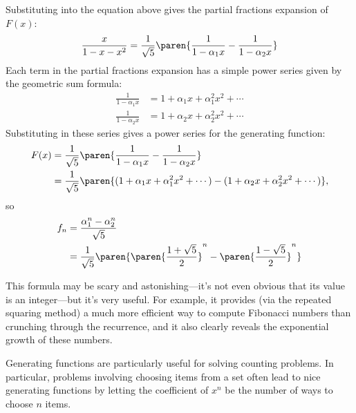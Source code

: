 Substituting into the equation above gives the partial fractions
expansion of $F(x)$:
%
\[
\frac{x}{1 - x - x^2} =
        \frac{1}{\sqrt{5}}
        \paren{\frac{1}{1 - \alpha_1 x} - \frac{1}{1 - \alpha_2 x}}
\]
%
Each term in the partial fractions expansion has a simple power series
given by the geometric sum formula:
%
\begin{align*}
\frac{1}{1 - \alpha_1 x} & = 1 + \alpha_1 x + \alpha_1^2 x^2 + \cdots \\
\frac{1}{1 - \alpha_2 x} & = 1 + \alpha_2 x + \alpha_2^2 x^2 + \cdots
\end{align*}
%
Substituting in these series gives a power series for the generating
function:
%
\begin{align*}
F(x) & =
  \frac{1}{\sqrt{5}}
  \paren{\frac{1}{1 - \alpha_1 x} -
        \frac{1}{1 - \alpha_2 x}}\\
    & = \frac{1}{\sqrt{5}}
        \paren{(1 + \alpha_1 x + \alpha_1^2 x^2 + \cdots) -
        (1 + \alpha_2 x + \alpha_2^2 x^2 + \cdots)},
\end{align*}
so
\begin{align*}
 f_n & = \frac{\alpha_1^n - \alpha_2^n}{\sqrt{5}} \\
                & = \frac{1}{\sqrt{5}}
        \paren{
         \paren{\frac{1 + \sqrt{5}}{2}}^n -
         \paren{\frac{1 - \sqrt{5}}{2}}^n}
\end{align*}

This formula may be scary and astonishing---it's not even obvious that
its value is an integer---but it's very useful.  For example, it provides
(via the repeated squaring method) a much more efficient way to compute
Fibonacci numbers than crunching through the recurrence, and it also
clearly reveals the exponential growth of these numbers.

\begin{problems}
\classproblems
{}

\homeworkproblems
{}

\end{problems}


Generating functions are particularly useful for solving counting
problems.  In particular, problems involving choosing items from a set
often lead to nice generating functions by letting the coefficient of
$x^n$ be the number of ways to choose $n$ items.

